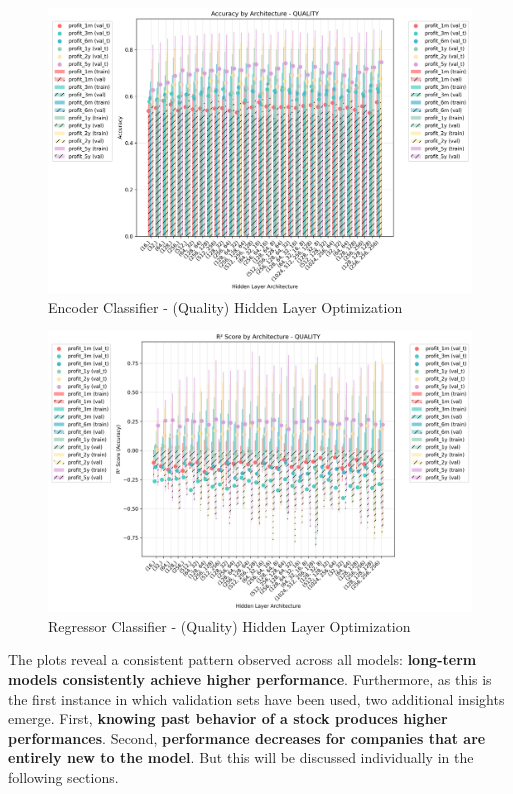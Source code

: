 \documentclass[11pt,english,a4paper,hidelinks]{book}
\begin{document}
\begin{figure}[H]
    \centering
    \includegraphics[width=1\textwidth]{images/code/models/neural_network/binary_classifier_nn/class_architecture_analysis_quality.png} %
    \caption{Encoder Classifier - (Quality) Hidden Layer Optimization}
    \label{fig:encoder_quality_hidden_layer}
\end{figure}

\begin{figure}[H]
    \centering
    \includegraphics[width=1\textwidth]{images/code/models/neural_network/regressor_nn/reg_architecture_analysis_quality.png}
    \caption{Regressor Classifier - (Quality) Hidden Layer Optimization}
    \label{fig:regressor_quality_hidden_layer}
\end{figure}

\noindent The plots reveal a consistent pattern observed across all models: \textbf{long-term models consistently achieve higher performance}. Furthermore, as this is the first instance in which validation sets have been used, two additional insights emerge. First, \textbf{knowing past behavior of a stock produces higher performances}. Second, \textbf{performance decreases for companies that are entirely new to the model}. But this will be discussed individually in the following sections.
\end{document}
